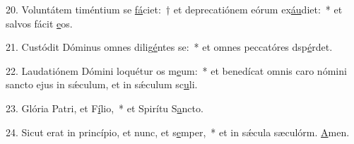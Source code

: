 20. Voluntátem timéntium se \uline{fá}ciet:~† et deprecatiónem eórum ex\uline{áu}diet:~* et salvos fácit \uline{e}os.\par 
21. Custódit Dóminus omnes dilig\uline{é}ntes se:~* et omnes peccatóres dsp\uline{é}rdet.\par 
22. Laudatiónem Dómini loquétur os m\uline{e}um:~* et benedícat omnis caro nómini sancto ejus in sǽculum, et in sǽculum sc\uline{u}li.\par 
23. Glória Patri, et F\uline{í}lio,~* et Spirítu S\uline{a}ncto.\par 
24. Sicut erat in princípio, et nunc, et s\uline{e}mper,~* et in sǽcula sæculórm. \uline{A}men.\par 
